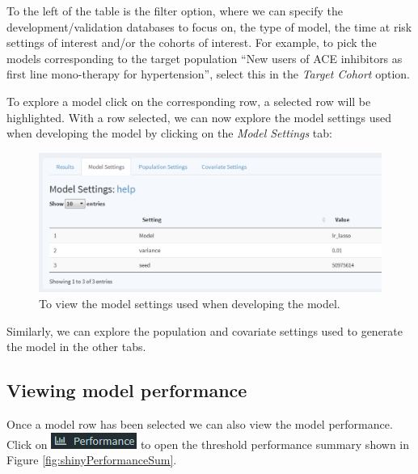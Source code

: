 \documentclass[11pt]{book}
\theoremstyle{definition}
\theoremstyle{definition}
\theoremstyle{definition}
\theoremstyle{remark}
\begin{document}
To the left of the table is the filter option, where we can specify the development/validation databases to focus on, the type of model, the time at risk settings of interest and/or the cohorts of interest. For example, to pick the models corresponding to the target population ``New users of ACE inhibitors as first line mono-therapy for hypertension'', select this in the \emph{Target Cohort} option.

To explore a model click on the corresponding row, a selected row will be highlighted. With a row selected, we can now explore the model settings used when developing the model by clicking on the \emph{Model Settings} tab:

\begin{figure}

{\centering \includegraphics[width=1\linewidth]{images/PatientLevelPrediction/shiny/shinyModel} 

}

\caption{To view the model settings used when developing the model.}\label{fig:shinyModel}
\end{figure}

Similarly, we can explore the population and covariate settings used to generate the model in the other tabs.

\hypertarget{viewing-model-performance}{%
\subsection{Viewing model performance}\label{viewing-model-performance}}

Once a model row has been selected we can also view the model performance. Click on \includegraphics{images/PatientLevelPrediction/performance.png} to open the threshold performance summary shown in Figure \ref{fig:shinyPerformanceSum}.
\end{document}
